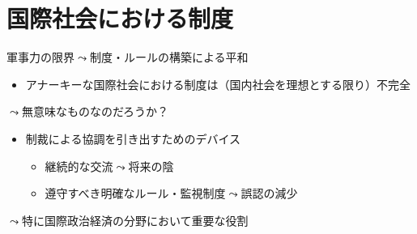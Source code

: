\documentclass[
  xelatex,
  ja=standard]{bxjsarticle}
\providecommand{\tightlist}{%
  \setlength{\itemsep}{0pt}\setlength{\parskip}{0pt}}\usepackage{longtable,booktabs,array}
\begin{document}
\hypertarget{ux56fdux969bux793eux4f1aux306bux304aux3051ux308bux5236ux5ea6}{%
\section{国際社会における制度}\label{ux56fdux969bux793eux4f1aux306bux304aux3051ux308bux5236ux5ea6}}

軍事力の限界\(\leadsto\)制度・ルールの構築による平和

\begin{itemize}
\tightlist
\item
  アナーキーな国際社会における制度は（国内社会を理想とする限り）不完全
\end{itemize}

\(\leadsto\)無意味なものなのだろうか？

\begin{itemize}
\tightlist
\item
  制裁による協調を引き出すためのデバイス

  \begin{itemize}
  \tightlist
  \item
    継続的な交流\(\leadsto\)将来の陰
  \item
    遵守すべき明確なルール・監視制度\(\leadsto\)誤認の減少
  \end{itemize}
\end{itemize}

\(\leadsto\)特に国際政治経済の分野において重要な役割


  
\end{document}
